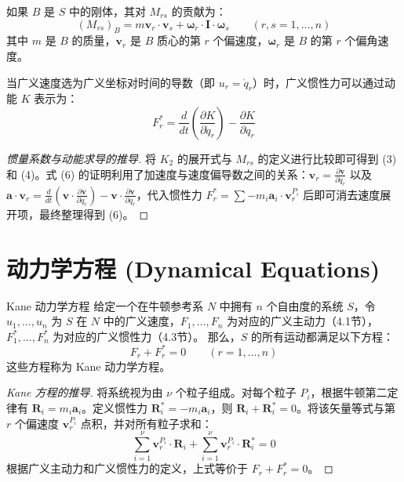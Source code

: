 如果 \(B\) 是 \(S\) 中的刚体，其对 \(M_{rs}\) 的贡献为：
\begin{equation}
(M_{rs})_B = m\mathbf{v}_r \cdot \mathbf{v}_s + \boldsymbol{\omega}_r \cdot \mathbf{I} \cdot \boldsymbol{\omega}_s \qquad (r,s=1,\dots,n) \tag{4}
\end{equation}
其中 \(m\) 是 \(B\) 的质量，\(\mathbf{v}_r\) 是 \(B\) 质心的第 \(r\) 个偏速度，\(\boldsymbol{\omega}_r\) 是 \(B\) 的第 \(r\) 个偏角速度。

当广义速度选为广义坐标对时间的导数（即 \(u_r = \dot{q}_r\)）时，广义惯性力可以通过动能 \(K\) 表示为：
\begin{equation}
F_r^* = \frac{d}{dt}\left(\frac{\partial K}{\partial \dot{q}_r}\right) - \frac{\partial K}{\partial q_r} \tag{6}
\end{equation}

\begin{proof}[惯量系数与动能求导的推导]
将 \(K_2\) 的展开式与 \(M_{rs}\) 的定义进行比较即可得到 (3) 和 (4)。式 (6) 的证明利用了加速度与速度偏导数之间的关系：\(\mathbf{v}_r = \frac{\partial \mathbf{v}}{\partial \dot{q}_r}\) 以及 \(\mathbf{a} \cdot \mathbf{v}_r = \frac{d}{dt}(\mathbf{v} \cdot \frac{\partial \mathbf{v}}{\partial \dot{q}_r}) - \mathbf{v} \cdot \frac{\partial \mathbf{v}}{\partial q_r}\)，代入惯性力 \(F_r^* = \sum -m_i \mathbf{a}_i \cdot \mathbf{v}_r^{P_i}\) 后即可消去速度展开项，最终整理得到 (6)。
\end{proof}

\section{动力学方程 (Dynamical Equations)}

\begin{myTheorem}{Kane 动力学方程}
给定一个在牛顿参考系 \(N\) 中拥有 \(n\) 个自由度的系统 \(S\)，令 \(u_1,\dots,u_n\) 为 \(S\) 在 \(N\) 中的广义速度，\(F_1,\dots,F_n\) 为对应的广义主动力（4.1节），\(F_1^*, \dots, F_n^*\) 为对应的广义惯性力（4.3节）。
那么，\(S\) 的所有运动都满足以下方程：
\begin{equation}
F_r + F_r^* = 0 \qquad (r=1,\dots,n) \tag{1}
\end{equation}
这些方程称为 Kane 动力学方程。
\end{myTheorem}

\begin{proof}[Kane 方程的推导]
将系统视为由 \(\nu\) 个粒子组成。对每个粒子 \(P_i\)，根据牛顿第二定律有 \(\mathbf{R}_i = m_i \mathbf{a}_i\)。定义惯性力 \(\mathbf{R}_i^* = -m_i \mathbf{a}_i\)，则 \(\mathbf{R}_i + \mathbf{R}_i^* = 0\)。将该矢量等式与第 \(r\) 个偏速度 \(\mathbf{v}_r^{P_i}\) 点积，并对所有粒子求和：
\begin{equation}
\sum_{i=1}^\nu \mathbf{v}_r^{P_i} \cdot \mathbf{R}_i + \sum_{i=1}^\nu \mathbf{v}_r^{P_i} \cdot \mathbf{R}_i^* = 0
\end{equation}
根据广义主动力和广义惯性力的定义，上式等价于 \(F_r + F_r^* = 0\)。
\end{proof}

